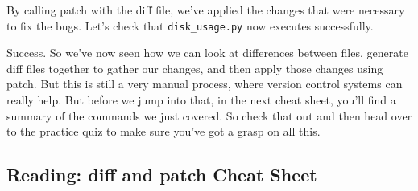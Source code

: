 	By calling patch with the diff file, we've applied the changes that were necessary to fix the bugs. Let's check that \verb|disk_usage.py| now executes successfully.
	
	Success. So we've now seen how we can look at differences between files, generate diff files together to gather our changes, and then apply those changes using patch. But this is still a very manual process, where version control systems can really help. But before we jump into that, in the next cheat sheet, you'll find a summary of the commands we just covered. So check that out and then head over to the practice quiz to make sure you've got a grasp on all this.
	
	\subsection{Reading: diff and patch Cheat Sheet}
	
